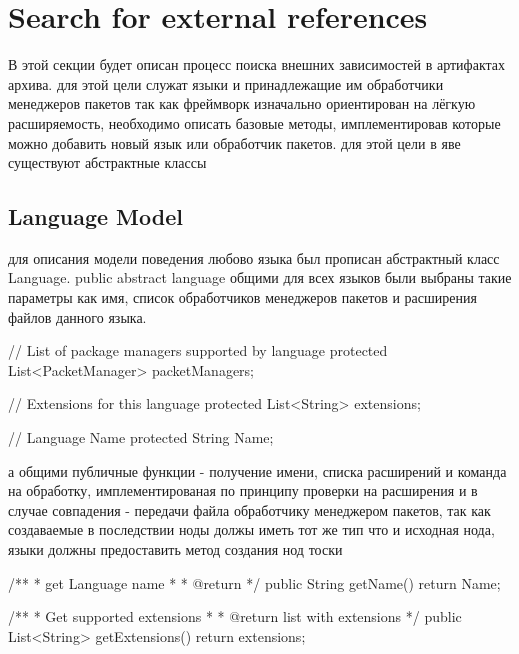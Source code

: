 \fi
\section{Search for external references}
В этой секции будет описан процесс поиска внешних зависимостей в артифактах архива.
для этой цели служат языки и принадлежащие им обработчики менеджеров пакетов
так как фреймворк изначально ориентирован на лёгкую расширяемость, необходимо описать базовые методы, имплементировав которые можно добавить новый язык или обработчик пакетов.
для этой цели в яве существуют абстрактные классы
\fi
\subsection*{Language Model}
для описания модели поведения любово языка был прописан абстрактный класс Language. public abstract language
общими для всех языков были выбраны такие параметры как имя, список обработчиков менеджеров пакетов и расширения файлов данного языка. 

// List of package managers supported by language
protected List<PacketManager> packetManagers;

// Extensions for this language
protected List<String> extensions;

// Language Name
protected String Name;

а общими публичные функции - получение имени, списка расширений и команда на обработку, имплементированая по принципу проверки на расширения и в случае совпадения - передачи файла обработчику менеджером пакетов, так как создаваемые в последствии ноды должы иметь тот же тип что и исходная нода, языки должны предоставить метод создания нод тоски

/**
* get Language name
* 
* @return
*/
public String getName() {
	return Name;
}

/**
* Get supported extensions
* 
* @return list with extensions
*/
public List<String> getExtensions() {
	return extensions;
}

